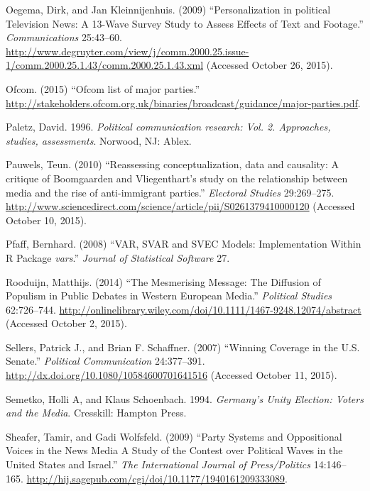 \documentclass[12pt,article]{article}
\begin{document}
\hypertarget{ref-oegemaux5fpersonalizationux5f2009}{}
Oegema, Dirk, and Jan Kleinnijenhuis. (2009) ``Personalization in
political Television News: A 13-Wave Survey Study to Assess Effects of
Text and Footage.'' \emph{Communications} 25:43--60.
\url{http://www.degruyter.com/view/j/comm.2000.25.issue-1/comm.2000.25.1.43/comm.2000.25.1.43.xml}
(Accessed October 26, 2015).

\hypertarget{ref-Ofcom:2015tt}{}
Ofcom. (2015) ``Ofcom list of major parties.''
\url{http://stakeholders.ofcom.org.uk/binaries/broadcast/guidance/major-parties.pdf}.

\hypertarget{ref-paletzux5fpoliticalux5f1996}{}
Paletz, David. 1996. \emph{Political communication research: Vol. 2.
Approaches, studies, assessments}. Norwood, NJ: Ablex.

\hypertarget{ref-pauwelsux5freassessingux5f2010}{}
Pauwels, Teun. (2010) ``Reassessing conceptualization, data and
causality: A critique of Boomgaarden and Vliegenthart's study on the
relationship between media and the rise of anti-immigrant parties.''
\emph{Electoral Studies} 29:269--275.
\url{http://www.sciencedirect.com/science/article/pii/S0261379410000120}
(Accessed October 10, 2015).

\hypertarget{ref-Pfaff:2008wk}{}
Pfaff, Bernhard. (2008) ``VAR, SVAR and SVEC Models: Implementation
Within R Package \emph{vars}.'' \emph{Journal of Statistical Software}
27.

\hypertarget{ref-rooduijnux5fmesmerisingux5f2014}{}
Rooduijn, Matthijs. (2014) ``The Mesmerising Message: The Diffusion of
Populism in Public Debates in Western European Media.'' \emph{Political
Studies} 62:726--744.
\url{http://onlinelibrary.wiley.com/doi/10.1111/1467-9248.12074/abstract}
(Accessed October 2, 2015).

\hypertarget{ref-sellersux5fwinningux5f2007}{}
Sellers, Patrick J., and Brian F. Schaffner. (2007) ``Winning Coverage
in the U.S. Senate.'' \emph{Political Communication} 24:377--391.
\url{http://dx.doi.org/10.1080/10584600701641516} (Accessed October 11,
2015).

\hypertarget{ref-semetkoux5fgermanysux5f1994}{}
Semetko, Holli A, and Klaus Schoenbach. 1994. \emph{Germany's Unity
Election: Voters and the Media}. Cresskill: Hampton Press.

\hypertarget{ref-Sheafer:2009hi}{}
Sheafer, Tamir, and Gadi Wolfsfeld. (2009) ``Party Systems and
Oppositional Voices in the News Media A Study of the Contest over
Political Waves in the United States and Israel.'' \emph{The
International Journal of Press/Politics} 14:146--165.
\url{http://hij.sagepub.com/cgi/doi/10.1177/1940161209333089}.
\end{document}
